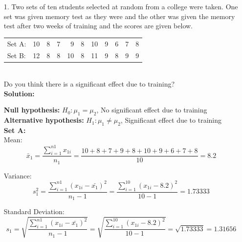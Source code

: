 \documentclass[a4paper,11pt,openright]{report}
\begin{document}
\begin{enumerate}

\item[1.] Two sets of ten students selected at random from a college were taken. One set was
given memory test as they were and the other was given the memory test after two weeks of
training and the scores are given below. \\
\begin{tabular}{lrrrrrrrrrr}
Set A: & 10 & 8 & 7 & 9 & 8 & 10 & 9 & 6 & 7 & 8 \\ 
Set B: & 12 & 8 & 8 & 10 & 8 & 11 & 9 & 8 & 9 & 9 \\
\end{tabular} \\
Do you think there is a significant effect due to training? \\

\textbf{Solution:}

\textbf{Null hypothesis:} $H_{0}: \mu_{1} = \mu_{2}$, \hspace{2px} No significant effect due
to training \\
\textbf{Alternative hypothesis:} $H_{1}: \mu_{1} \neq \mu_{2}$, \hspace{2px} Significant
effect due to training \\

\textbf{Set A:} \\ 
\hspace*{10mm} Mean:
\begin{equation*}
\bar x_{1} = \frac{\sum\limits_{i=1}^{n1} x_{1i}}{n_{1}}
    	= \frac{10 + 8 + 7 + 9 + 8 + 10 + 9 + 6 + 7 + 8}{10}
    	= 8.2
\end{equation*}

\hspace*{10mm} Variance:
\begin{equation*}
s_{1}^{2} = \frac{\sum\limits_{i=1}^{n1} (x_{1i} - \bar {x_{1}})^{2}}{n_{1} - 1}
		= \frac{\sum\limits_{i=1}^{10} (x_{1i} - 8.2)^{2}}{10 -1} = 1.73333
\end{equation*}

\hspace*{10mm} Standard Deviation:
\begin{equation*}
s_{1} = \sqrt{\frac{\sum\limits_{i=1}^{n1} (x_{1i} - \bar {x_{1}})^{2}}{n_{1} - 1}}
	= \sqrt{\frac{\sum\limits_{i=1}^{10} (x_{1i} - 8.2)^{2}}{10 -1}}
	= \sqrt{1.73333} = 1.31656
\end{equation*}

\pagebreak


\end{enumerate}
\end{document}
